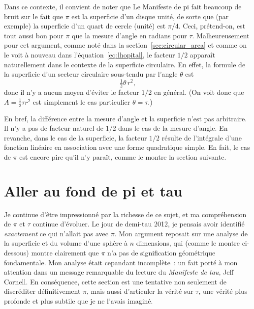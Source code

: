 Dans ce contexte, il convient de noter que Le Manifeste de pi fait beaucoup de
bruit sur le fait que $\pi$ est la superficie d'un disque unité, de sorte que
(par exemple) la superficie d'un quart de cercle (unité) est $\pi/4$. Ceci,
prétend-on, est tout aussi bon pour $\pi$ que la mesure d'angle en radians pour
$\tau$. Malheureusement pour cet argument, comme noté dans la
section~\ref{sec:circular_area} et comme on le voit à nouveau dans
l'équation~\eqref{eq:lhopital}, le facteur $1/2$ apparaît naturellement dans le
contexte de la superficie circulaire. En effet, la formule de la superficie d'un
secteur circulaire sous-tendu par l'angle $\theta$ est
\[
\tfrac{1}{2}\theta\, r^2,
\]
donc il n'y a aucun moyen d'éviter le facteur $1/2$ en général. (On voit donc
que $A = \frac{1}{2}\tau r^2$ est simplement le cas particulier $\theta =
\tau$.)

En bref, la différence entre la mesure d'angle et la superficie n'est pas
arbitraire. \linebreak Il n'y a pas de facteur naturel de $1/2$ dans le cas de
la mesure d'angle. En revanche, dans le cas de la superficie, la facteur $1/2$
résulte de l'intégrale d'une fonction linéaire en association avec une forme
quadratique simple. En fait, le cas de $\pi$ est encore pire qu'il n'y paraît,
comme le montre la section suivante.


\section{Aller au fond de pi et tau} %
\label{sec:getting_to_the_bottom_of_pi}

Je continue d'être impressionné par la richesse de ce sujet, et ma compréhension
de $\pi$ et $\tau$ continue d'évoluer. Le jour de demi-tau 2012, je pensais
avoir identifié \emph{exactement} ce qui n'allait pas avec $\pi$. Mon argument
reposait sur une analyse de la superficie et du volume d'une sphère à $n$
dimensions, qui (comme le montre ci-dessous) montre clairement que $\pi$ n'a pas
de signification géométrique fondamentale. Mon analyse était cepandant
incomplète~: un fait porté à mon attention dans un message remarquable du
lecture du \emph{Manifeste de tau}, Jeff Cornell. En conséquence, cette section
est une tentative non seulement de discréditer définitivement $\pi$, mais aussi
d'articuler la vérité sur $\tau$, une vérité plus profonde et plus subtile que
je ne l'avais imaginé.

